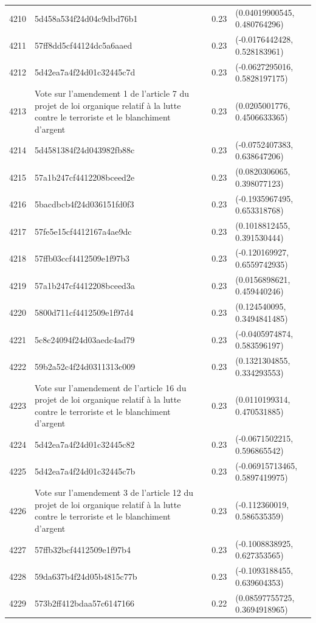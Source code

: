 \begin{table}[ht]
\begin{tabular}{rlrl}
  4210 & 5d458a534f24d04c9dbd76b1 & 0.23 & (0.04019900545, 0.480764296) \\ 
  4211 & 57ff8dd5cf44124dc5a6aaed & 0.23 & (-0.0176442428, 0.528183961) \\ 
  4212 & 5d42ea7a4f24d01c32445c7d & 0.23 & (-0.0627295016, 0.5828197175) \\ 
  4213 & Vote sur l'amendement 1 de l'article 7 du projet de loi organique relatif à la lutte contre le terroriste et le blanchiment d'argent & 0.23 & (0.0205001776, 0.4506633365) \\ 
  4214 & 5d4581384f24d043982fb88c & 0.23 & (-0.0752407383, 0.638647206) \\ 
  4215 & 57a1b247cf4412208bceed2e & 0.23 & (0.0820306065, 0.398077123) \\ 
  4216 & 5bacdbcb4f24d036151fd0f3 & 0.23 & (-0.1935967495, 0.653318768) \\ 
  4217 & 57fe5e15cf4412167a4ae9dc & 0.23 & (0.1018812455, 0.391530444) \\ 
  4218 & 57ffb03ccf4412509e1f97b3 & 0.23 & (-0.120169927, 0.6559742935) \\ 
  4219 & 57a1b247cf4412208bceed3a & 0.23 & (0.0156898621, 0.459440246) \\ 
  4220 & 5800d711cf4412509e1f97d4 & 0.23 & (0.124540095, 0.3494841485) \\ 
  4221 & 5c8c24094f24d03aedc4ad79 & 0.23 & (-0.0405974874, 0.583596197) \\ 
  4222 & 59b2a52c4f24d0311313c009 & 0.23 & (0.1321304855, 0.334293553) \\ 
  4223 & Vote sur l'amendement de l'article 16 du projet de loi organique relatif à la lutte contre le terroriste et le blanchiment d'argent & 0.23 & (0.0110199314, 0.470531885) \\ 
  4224 & 5d42ea7a4f24d01c32445c82 & 0.23 & (-0.0671502215, 0.596865542) \\ 
  4225 & 5d42ea7a4f24d01c32445c7b & 0.23 & (-0.06915713465, 0.5897419975) \\ 
  4226 & Vote sur l'amendement 3 de l'article 12 du projet de loi organique relatif à la lutte contre le terroriste et le blanchiment d'argent & 0.23 & (-0.112360019, 0.586535359) \\ 
  4227 & 57ffb32bcf4412509e1f97b4 & 0.23 & (-0.1008838925, 0.627353565) \\ 
  4228 & 59da637b4f24d05b4815c77b & 0.23 & (-0.1093188455, 0.639604353) \\ 
  4229 & 573b2ff412bdaa57c6147166 & 0.22 & (0.08597755725, 0.3694918965) \\ 

\end{tabular}
\end{table}
